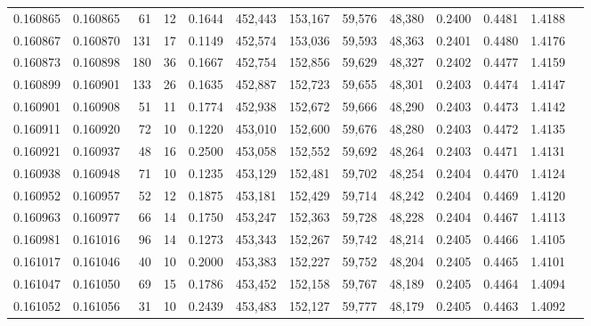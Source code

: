 \begin{tabular}{rrrrrrrrrrrrr}
0.160865 & 0.160865 &    61 &  12 &                                     0.1644 & 452,443 & 153,167 &  59,576 &  48,380 & 0.2400 & 0.4481 & 1.4188 \\
0.160867 & 0.160870 &   131 &  17 &                                     0.1149 & 452,574 & 153,036 &  59,593 &  48,363 & 0.2401 & 0.4480 & 1.4176 \\
0.160873 & 0.160898 &   180 &  36 &                                     0.1667 & 452,754 & 152,856 &  59,629 &  48,327 & 0.2402 & 0.4477 & 1.4159 \\
0.160899 & 0.160901 &   133 &  26 &                                     0.1635 & 452,887 & 152,723 &  59,655 &  48,301 & 0.2403 & 0.4474 & 1.4147 \\
0.160901 & 0.160908 &    51 &  11 &                                     0.1774 & 452,938 & 152,672 &  59,666 &  48,290 & 0.2403 & 0.4473 & 1.4142 \\
0.160911 & 0.160920 &    72 &  10 &                                     0.1220 & 453,010 & 152,600 &  59,676 &  48,280 & 0.2403 & 0.4472 & 1.4135 \\
0.160921 & 0.160937 &    48 &  16 &                                     0.2500 & 453,058 & 152,552 &  59,692 &  48,264 & 0.2403 & 0.4471 & 1.4131 \\
0.160938 & 0.160948 &    71 &  10 &                                     0.1235 & 453,129 & 152,481 &  59,702 &  48,254 & 0.2404 & 0.4470 & 1.4124 \\
0.160952 & 0.160957 &    52 &  12 &                                     0.1875 & 453,181 & 152,429 &  59,714 &  48,242 & 0.2404 & 0.4469 & 1.4120 \\
0.160963 & 0.160977 &    66 &  14 &                                     0.1750 & 453,247 & 152,363 &  59,728 &  48,228 & 0.2404 & 0.4467 & 1.4113 \\
0.160981 & 0.161016 &    96 &  14 &                                     0.1273 & 453,343 & 152,267 &  59,742 &  48,214 & 0.2405 & 0.4466 & 1.4105 \\
0.161017 & 0.161046 &    40 &  10 &                                     0.2000 & 453,383 & 152,227 &  59,752 &  48,204 & 0.2405 & 0.4465 & 1.4101 \\
0.161047 & 0.161050 &    69 &  15 &                                     0.1786 & 453,452 & 152,158 &  59,767 &  48,189 & 0.2405 & 0.4464 & 1.4094 \\
0.161052 & 0.161056 &    31 &  10 &                                     0.2439 & 453,483 & 152,127 &  59,777 &  48,179 & 0.2405 & 0.4463 & 1.4092 \\

\end{tabular}
